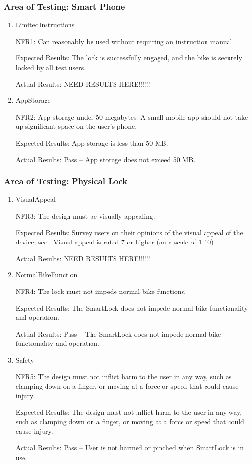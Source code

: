 \documentclass[12pt, titlepage]{article}
\begin{document}
\subsubsection{Area of Testing: Smart Phone}

\begin{enumerate}

\item{LimitedInstructions

NFR1: Can reasonably be used without requiring an instruction manual. }

Expected Results: The lock is successfully engaged, and the bike is securely locked by all test users.

Actual Results: NEED RESULTS HERE!!!!!!

\item{AppStorage

NFR2: App storage under 50 megabytes. A small mobile app should not take up significant space on the user’s phone.  }

Expected Results: App storage is less than 50 MB. 

Actual Results: Pass -- App storage does not exceed 50 MB. 

\end{enumerate}

\subsubsection{Area of Testing: Physical Lock}
\begin{enumerate}

\item{VisualAppeal

NFR3: The design must be visually appealing. }

Expected Results: Survey users on their opinions of the visual appeal of the device; see . Visual appeal is rated 7 or higher (on a scale of 1-10).

Actual Results: NEED RESULTS HERE!!!!!!

\item{NormalBikeFunction

NFR4: The lock must not impede normal bike functions. }

Expected Results: The SmartLock does not impede normal bike functionality and operation. 

Actual Results: Pass -- The SmartLock does not impede normal bike functionality and operation. 

\item{Safety

NFR5: The design must not inflict harm to the user in any way, such as clamping down on a finger, or moving at a force or speed that could cause injury. }

Expected Results: The design must not inflict harm to the user in any way, such as clamping down on a finger, or moving at a force or speed that could cause injury. 

Actual Results: Pass -- User is not harmed or pinched when SmartLock is in use. 

\end{enumerate}
\end{document}
